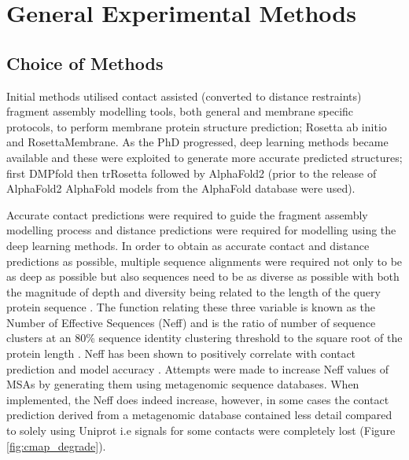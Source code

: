 

\chapter{General Experimental Methods}
\section{Choice of Methods}
Initial methods utilised contact assisted (converted to distance restraints) fragment assembly modelling tools, both general and membrane specific protocols, to perform membrane protein structure prediction; Rosetta ab initio and RosettaMembrane.  As the PhD progressed, deep learning methods became available and these were exploited to generate more accurate predicted structures; first DMPfold then trRosetta followed by AlphaFold2 (prior to the release of AlphaFold2 AlphaFold models from the AlphaFold database were used).

Accurate contact predictions were required to guide the fragment assembly modelling process and distance predictions were required for modelling using the deep learning methods.  In order to obtain as accurate contact and distance predictions as possible, multiple sequence alignments were required not only to be as deep as possible but also sequences need to be as diverse as possible with both the magnitude of depth and diversity being related to the length of the query protein sequence \cite{ovchinnikov2015large}. The function relating these three variable is known as the Number of Effective Sequences (Neff) and is the ratio of number of sequence clusters at an 80\% sequence identity clustering threshold to the square root of the protein length \cite{ovchinnikov2015large}.  Neff has been shown to positively correlate with contact prediction and model accuracy \cite{Ovchinnikov2017}.  Attempts were made to increase Neff values of MSAs by generating them using metagenomic sequence databases. When implemented, the Neff does indeed increase, however, in some cases the contact prediction derived from a metagenomic database contained less detail compared to solely using Uniprot i.e signals for some contacts were completely lost (Figure \ref{fig:cmap_degrade}). 

